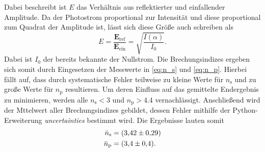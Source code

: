 Dabei beschreibt ist $E$ das Verhältnis aus reflektierter und einfallender Amplitude. Da der Photostrom
proportional zur Intensität und diese proportional zum Quadrat der Amplitude ist, lässt sich diese Größe auch schreiben als
\begin{equation*}
    E = \frac{\symbf{E}_{\text{ref}}}{\symbf{E}_{\text{ein}}} = \sqrt{\frac{I(\alpha)}{I_0}}.
\end{equation*}
Dabei ist $I_0$ der bereits bekannte der Nullstrom.
Die Brechungsindizes ergeben sich somit durch Eingesetzen der Messwerte in \eqref{eq:n_s} und \eqref{eq:n_p}.
Hierbei fällt auf, dass durch systematische Fehler teilweise zu kleine Werte für $n_{\text{s}}$ und zu große Werte für $n_{\text{p}}$
resultieren.
Um deren Einfluss auf das gemittelte Endergebnis zu minimieren, werden alle $n_{\text{s}}<3$ und $n_{\text{p}}>4.4$
vernachlässigt.
Anschließend wird der Mttelwert aller Brechungsindizes gebildet, dessen Fehler mithilfe der Python-Erweiterung
\textit{uncertainties} \cite{uncertainties} bestimmt wird. Die Ergebnisse lauten somit
\begin{align*}
    \bar{n}_{\text{s}}&=\qty{3.42+-0.29}{} \\
    \bar{n}_{\text{p}}&=\qty{3.4+-0.4}{}.
\end{align*}


